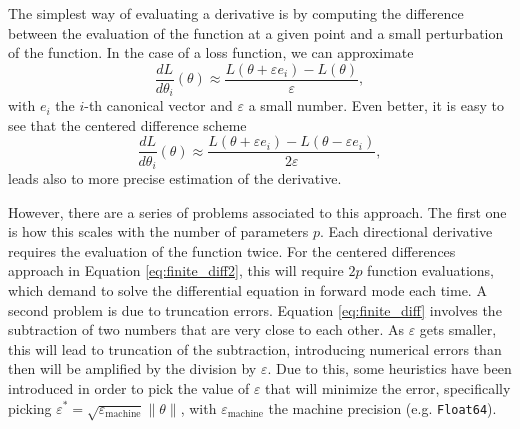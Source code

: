 The simplest way of evaluating a derivative is by computing the difference between the evaluation of the function at a given point and a small perturbation of the function. In the case of a loss function, we can approximate
\begin{equation}
 \frac{dL}{d\theta_i} (\theta) \approx \frac{L(\theta + \varepsilon e_i ) - L(\theta)}{\varepsilon},
 \label{eq:finite_diff}
\end{equation}
with $e_i$ the $i$-th canonical vector and $\varepsilon$ a small number. Even better, it is easy to see that the centered difference scheme
\begin{equation}
 \frac{dL}{d\theta_i} (\theta) \approx \frac{L(\theta + \varepsilon e_i ) - L(\theta - \varepsilon e_i)}{2\varepsilon},
 \label{eq:finite_diff2}
\end{equation}
leads also to more precise estimation of the derivative.

However, there are a series of problems associated to this approach. The first one is how this scales with the number of parameters $p$. Each directional derivative requires the evaluation of the function twice. For the centered differences approach in Equation \eqref{eq:finite_diff2}, this will require $2p$ function evaluations, which demand to solve the differential equation in forward mode each time.
A second problem is due to truncation errors. Equation \eqref{eq:finite_diff} involves the subtraction of two numbers that are very close to each other. As $\varepsilon$ gets smaller, this will lead to truncation of the subtraction, introducing numerical errors than then will be amplified by the division by $\varepsilon$.
Due to this, some heuristics have been introduced in order to pick the value of $\varepsilon$ that will minimize the error, specifically picking $\varepsilon^* = \sqrt{\varepsilon_\text{machine}} \| \theta \|$, with $\varepsilon_\text{machine}$ the machine precision (e.g. \texttt{Float64}).
 
